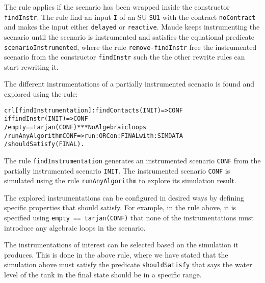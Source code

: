 The rule applies if the scenario has been wrapped inside the constructor \texttt{findInstr}.
The rule find an input \texttt{I} of an SU \texttt{SU1} with the contract \texttt{noContract} and makes the input either \texttt{delayed} or \texttt{reactive}.
Maude keeps instrumenting the scenario until the scenario is instrumented and satisfies the equational predicate \texttt{scenarioInstrumented}, where the rule \texttt{remove-findInstr} free the instrumented scenario from the constructor \texttt{findInstr} such the the other rewrite rules can start rewriting it.

The different instrumentations of a partially instrumented scenario is found and explored using the rule:

\small
\begin{alltt}
crl [findInstrumentation]: findContacts(INIT) => CONF
    if findInstr(INIT) => CONF
    / empty == tarjan(CONF) *** No Algebraic loops
    / runAnyAlgorithm CONF => run: ORC on: FINAL with: SIMDATA
    / shouldSatisfy(FINAL) .
\end{alltt}
\normalsize

The rule \texttt{findInstrumentation} generates an instrumented scenario \texttt{CONF} from the partially instrumented scenario \texttt{INIT}.
The instrumented scenario \texttt{CONF} is simulated using the rule \texttt{runAnyAlgorithm} to explore its simulation result.

The explored instrumentations can be configured in desired ways by defining specific properties that should satisfy.
For example, in the rule above, it is specified using \texttt{empty == tarjan(CONF)} that none of the instrumentations must introduce any algebraic loops in the scenario.

The instrumentations of interest can be selected based on the simulation it produces. 
This is done in the above rule, where we have stated that the simulation above must satisfy the predicate \texttt{shouldSatisfy} that says the water level of the tank in the final state should be in a specific range.

